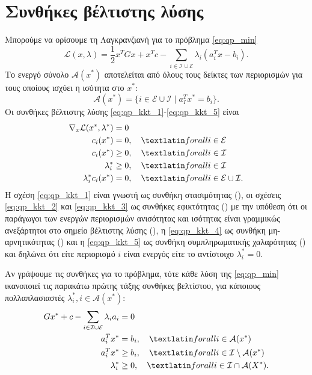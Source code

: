 \section{Συνθήκες βέλτιστης λύσης}
Μπορούμε να ορίσουμε τη Λαγκρανζιανή για το πρόβλημα \eqref{eq:qp_min}
\begin{equation*}
    \mathcal{L}(x, \lambda) = \frac{1}{2}x^TGx + x^Tc - \sum_{i\in
    \mathcal{I}\cup \mathcal{E}}\lambda_i(a_i^Tx - b_i).
\end{equation*}
Το ενεργό σύνολο $\mathcal{A}(x^*)$ αποτελείται από όλους τους δείκτες των
περιορισμών για τους οποίους ισχύει η ισότητα στο $x^*$:
\begin{equation*}
    \mathcal{A}(x^*) = \{ i \in \mathcal{E}\cup \mathcal{I} \mid a^T_Ix^* =
    b_i\}.
\end{equation*}
Οι συνθήκες βέλτιστης λύσης 
\eqref{eq:qp_kkt_1}-\eqref{eq:qp_kkt_5} είναι
\begin{align}
    \nabla_x \mathcal{L}(x^*, \lambda^*) &= 0 \label{eq:qp_kkt_1} \\
    c_i(x^*) &= 0,\quad \tl{for all } i \in \mathcal{E}\label{eq:qp_kkt_2} \\
    c_i(x^*) &\geq 0,\quad \tl{for all } i \in \mathcal{I} \label{eq:qp_kkt_3}\\
    \lambda_i^* &\geq 0,\quad \tl{for all } i \in \mathcal{I} \label{eq:qp_kkt_4}\\
    \lambda_i^*c_i(x^*) &= 0,\quad \tl{for all } i \in \mathcal{E}\cup\mathcal{I}.\label{eq:qp_kkt_5}
\end{align}
Η σχέση \eqref{eq:qp_kkt_1} είναι γνωστή ως συνθήκη στασιμότητας
(), οι σχέσεις \eqref{eq:qp_kkt_2} και
\eqref{eq:qp_kkt_3} ως συνθήκες εφικτότητας ()
με την υπόθεση ότι οι παράγωγοι των ενεργών περιορισμών ανισότητας και
ισότητας είναι γραμμικώς ανεξάρτητοι στο σημείο βέλτιστης λύσης (),
η \eqref{eq:qp_kkt_4} ως συνθήκη μη-αρνητικότητας ()
και η \eqref{eq:qp_kkt_5} ως συνθήκη συμπληρωματικής χαλαρότητας
() και δηλώνει ότι είτε περιορισμό $i$ είναι ενεργός
είτε το αντίστοιχο $\lambda_i^* = 0$.

Αν γράψουμε τις συνθήκες  για το πρόβλημα, τότε κάθε λύση της
\eqref{eq:qp_min} ικανοποιεί τις παρακάτω πρώτης τάξης συνθήκες βελτίστου, για
κάποιους πολλαπλασιαστές  $\lambda^*_i, i \in \mathcal{A}(x^*)$:
\begin{align}
    Gx^* + c - \sum_{i\in \mathcal{I}\cup \mathcal{E}}\lambda_ia_i &=0
    \label{eq:qp_kktn_1}\\
    a_i^Tx^* &= b_i,\quad \tl{for all } i \in \mathcal{A}(x^*)
    \label{eq:qp_kktn_2}\\
    a_i^Tx^* &\geq b_i,\quad \tl{for all } i \in
    \mathcal{I}\setminus\mathcal{A}(x^*) \label{eq:qp_kktn_3}\\
    \lambda_i^* &\geq 0,\quad \tl{for all } i \in
    \mathcal{I}\cap\mathcal{A}(X^*).\label{eq:qp_kktn_4}
\end{align}

